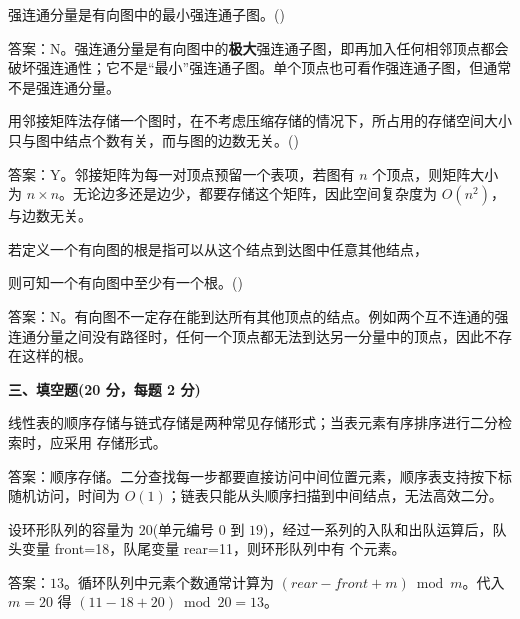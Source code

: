 \begin{question}
强连通分量是有向图中的最小强连通子图。(\quad)
\begin{solution}
答案：N。强连通分量是有向图中的\textbf{极大}强连通子图，即再加入任何相邻顶点都会破坏强连通性；它不是“最小”强连通子图。单个顶点也可看作强连通子图，但通常不是强连通分量。
\end{solution}
\end{question}

\begin{question}
用邻接矩阵法存储一个图时，在不考虑压缩存储的情况下，所占用的存储空间大小只与图中结点个数有关，而与图的边数无关。(\quad)
\begin{solution}
答案：Y。邻接矩阵为每一对顶点预留一个表项，若图有 $n$ 个顶点，则矩阵大小为 $n\times n$。无论边多还是边少，都要存储这个矩阵，因此空间复杂度为 $O(n^2)$，与边数无关。
\end{solution}
\end{question}

\begin{question}
若定义一个有向图的根是指可以从这个结点到达图中任意其他结点，\par
则可知一个有向图中至少有一个根。(\quad)
\begin{solution}
答案：N。有向图不一定存在能到达所有其他顶点的结点。例如两个互不连通的强连通分量之间没有路径时，任何一个顶点都无法到达另一分量中的顶点，因此不存在这样的根。
\end{solution}
\end{question}

\textbf{三、填空题(20 分，每题 2 分)}

\begin{question}
线性表的顺序存储与链式存储是两种常见存储形式；当表元素有序排序进行二分检索时，应采用 \blank 存储形式。
\begin{solution}
答案：顺序存储。二分查找每一步都要直接访问中间位置元素，顺序表支持按下标随机访问，时间为 $O(1)$；链表只能从头顺序扫描到中间结点，无法高效二分。
\end{solution}
\end{question}

\begin{question}
设环形队列的容量为 $20$(单元编号 $0$ 到 $19$)，经过一系列的入队和出队运算后，队头变量 front=18，队尾变量 rear=11，则环形队列中有 \blank 个元素。
\begin{solution}
答案：$13$。循环队列中元素个数通常计算为 $(rear-front+m)\bmod m$。代入 $m=20$ 得 $(11-18+20)\bmod20=13$。
\end{solution}
\end{question}

